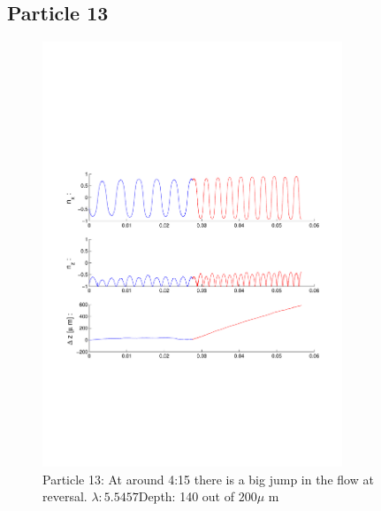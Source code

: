 \subsection{Particle 13}
\begin{figure}[H]
\centering
\includegraphics[width=0.8\textwidth]{Images/Particle 13/Particle13.pdf}
\caption{Particle 13: At around 4:15 there is a big jump in the flow at reversal. $ \lambda: 5.5457$Depth: 140 out of $200 \mu $ m}
\end{figure}

